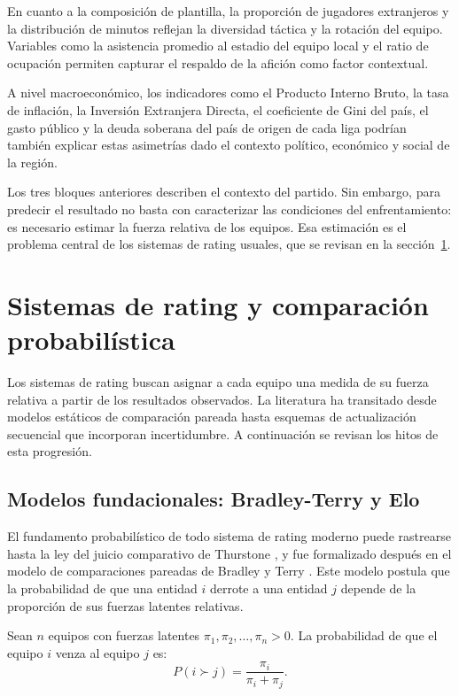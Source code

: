 En cuanto a la composici\'on de plantilla, la proporci\'on de jugadores extranjeros y la distribuci\'on de minutos reflejan la diversidad t\'actica y la rotaci\'on del equipo. Variables como la asistencia promedio al estadio del equipo local y el ratio de ocupaci\'on permiten capturar el respaldo de la afici\'on como factor contextual.

A nivel macroecon\'omico, los indicadores como el Producto Interno Bruto, la tasa de inflaci\'on, la Inversi\'on Extranjera Directa, el coeficiente de Gini del pa\'is, el gasto p\'ublico y la deuda soberana del pa\'is de origen de cada liga podr\'ian tambi\'en explicar estas asimetr\'ias dado el contexto pol\'itico, econ\'omico y social de la regi\'on.

Los tres bloques anteriores describen el contexto del partido. Sin embargo, para predecir el resultado no basta con caracterizar las condiciones del enfrentamiento: es necesario estimar la fuerza relativa de los equipos. Esa estimaci\'on es el problema central de los sistemas de rating usuales, que se revisan en la secci\'on~\ref{sec:rating}.

\section{Sistemas de rating y comparaci\'on probabil\'istica}
\label{sec:rating}

Los sistemas de rating buscan asignar a cada equipo una medida de su fuerza relativa a partir de los resultados observados. La literatura ha transitado desde modelos est\'aticos de comparaci\'on pareada hasta esquemas de actualizaci\'on secuencial que incorporan incertidumbre. A continuaci\'on se revisan los hitos de esta progresi\'on.

\subsection{Modelos fundacionales: Bradley-Terry y Elo}

El fundamento probabil\'istico de todo sistema de rating moderno puede rastrearse hasta la ley del juicio comparativo de Thurstone \cite{thurstone1927}, y fue formalizado despu\'es en el modelo de comparaciones pareadas de Bradley y Terry \cite{bradley1952}. Este modelo postula que la probabilidad de que una entidad $i$ derrote a una entidad $j$ depende de la proporci\'on de sus fuerzas latentes relativas.

\begin{definition}
	Sean $n$ equipos con fuerzas latentes $\pi_1, \pi_2, \dots, \pi_n > 0$. La probabilidad de que el equipo $i$ venza al equipo $j$ es:
	\begin{equation}
		P(i \succ j) = \frac{\pi_i}{\pi_i + \pi_j}.
	\end{equation}
\end{definition}


